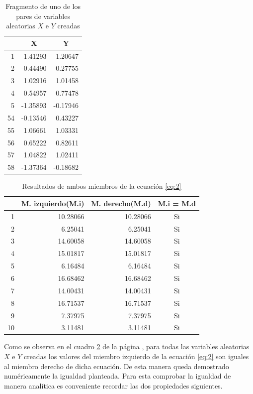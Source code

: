 \documentclass{article}
\begin{document}
\begin{table}[H]
  \centering
  \caption{Fragmento de uno de los pares de variables aleatorias $X$ e $Y$ creadas}
    \begin{tabular}{rrr}
    \toprule
          & \multicolumn{1}{c}{X} & \multicolumn{1}{c}{Y} \\
    \midrule
    1     & 1.41293 & 1.20647 \\
    2     & -0.44490 & 0.27755 \\
    3     & 1.02916 & 1.01458 \\
    4     & 0.54957 & 0.77478 \\
    5     & -1.35893 & -0.17946 \\
    54    & -0.13546 & 0.43227 \\
    55    & 1.06661 & 1.03331 \\
    56    & 0.65222 & 0.82611 \\
    57    & 1.04822 & 1.02411 \\
    58    & -1.37364 & -0.18682 \\
    \bottomrule
    \end{tabular}%
  \label{tab:tab:1}%
\end{table}%
\begin{table}[H]
  \centering
  \caption{Resultados de ambos miembros de la ecuación \ref{eq:2}}
    \begin{tabular}{rrrc}
    \toprule
          & \multicolumn{1}{l}{M. izquierdo(M.i)} & \multicolumn{1}{l}{M. derecho(M.d)} & \multicolumn{1}{l}{M.i  =  M.d} \\
    \midrule
    1     & 10.28066 & 10.28066 & Si \\
    2     & 6.25041 & 6.25041 & Si \\
    3     & 14.60058 & 14.60058 & Si \\
    4     & 15.01817 & 15.01817 & Si \\
    5     & 6.16484 & 6.16484 & Si \\
    6     & 16.68462 & 16.68462 & Si \\
    7     & 14.00431 & 14.00431 & Si \\
    8     & 16.71537 & 16.71537 & Si \\
    9     & 7.37975 & 7.37975 & Si \\
    10    & 3.11481 & 3.11481 & Si \\
    \bottomrule
    \end{tabular}%
  \label{tab:2}%
\end{table}%
Como se observa en el cuadro \ref{tab:2} de la página \pageref{tab:2}, para todas las variables aleatorias $X$ e $Y$ creadas los valores del miembro izquierdo de la ecuación \ref{eq:2} son iguales al miembro derecho de dicha ecuación. De esta manera queda demostrado numéricamente la igualdad planteada. Para esta comprobar la igualdad de manera analítica es conveniente recordar las dos propiedades siguientes.
\end{document}
